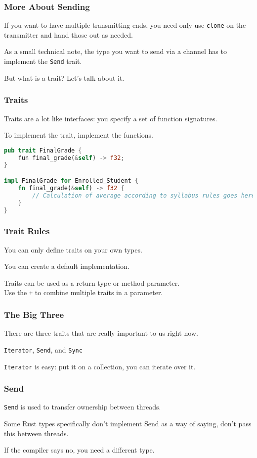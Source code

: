 \begin{frame}
\frametitle{More About Sending}

If you want to have multiple transmitting ends, you need only use \texttt{clone} on the transmitter and hand those out as needed. 


As a small technical note, the type you want to send via a channel has to implement the \texttt{Send} trait.

But what is a trait? Let's talk about it.

\end{frame}


\begin{frame}[fragile]
\frametitle{Traits}

Traits are a lot like interfaces: you specify a set of function signatures.

To implement the trait, implement the functions.

\begin{lstlisting}[language=Rust]
pub trait FinalGrade {
	fun final_grade(&self) -> f32;
}

impl FinalGrade for Enrolled_Student {
    fn final_grade(&self) -> f32 {
        // Calculation of average according to syllabus rules goes here
    }	
}  
\end{lstlisting}

\end{frame}

\begin{frame}
\frametitle{Trait Rules}

You can only define traits on your own types.

You can create a default implementation.

Traits can be used as a return type or method parameter.\\
\quad Use the \texttt{+} to combine multiple traits in a parameter.

\end{frame}


\begin{frame}
\frametitle{The Big Three}

There are three traits that are really important to us right now. 

\texttt{Iterator}, \texttt{Send}, and \texttt{Sync}


\texttt{Iterator} is easy: put it on a collection, you can iterate over it.
\end{frame}


\begin{frame}
\frametitle{Send}

\texttt{Send} is used to transfer ownership between threads.

Some Rust types specifically don't implement Send as a way of saying, don't pass this between threads. 

If the compiler says no, you need a different type.

\end{frame}


